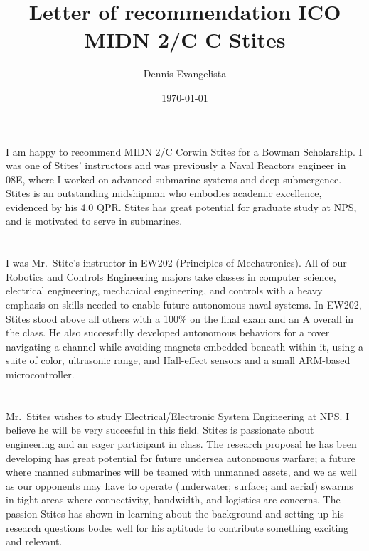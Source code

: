 \documentclass[10pt,courier]{navymemo}
\author{Dennis Evangelista}
\title{Letter of recommendation ICO MIDN 2/C C Stites}
\date{\today}
\begin{document}
\makedateblock{}

\MEMORANDUM{}

\begin{navyletterheader}
\navyskip{}%
\navysubjline{}%
\end{navyletterheader}


\section{} 
I am happy to recommend MIDN 2/C Corwin Stites for a Bowman Scholarship.  I was one of Stites' instructors and was previously a Naval Reactors engineer in 08E, where I worked on advanced submarine systems and deep submergence. Stites is an outstanding midshipman who embodies academic excellence, evidenced by his 4.0 QPR. Stites has great potential for graduate study at NPS, and is motivated to serve in submarines.  

\section{}
I was Mr.~Stite's instructor in EW202 (Principles of Mechatronics).  All of our Robotics and Controls Engineering majors take classes in computer science, electrical engineering, mechanical engineering, and controls with a heavy emphasis on skills needed to enable future autonomous naval systems. In EW202, Stites stood above all others with a 100\% on the final exam and an A overall in the class. He also successfully developed autonomous behaviors for a rover navigating a channel while avoiding magnets embedded beneath within it, using a suite of color, ultrasonic range, and Hall-effect sensors and a small ARM-based microcontroller. 

\section{}
Mr.~Stites wishes to study Electrical/Electronic System Engineering at NPS. I believe he will be very succesful in this field. Stites is passionate about engineering and an eager participant in class. The research proposal he has been developing has great potential for future undersea autonomous warfare; a future where manned submarines will be teamed with unmanned assets, and we as well as our opponents may have to operate (underwater; surface; and aerial) swarms in tight areas where connectivity, bandwidth, and logistics are concerns. The passion Stites has shown in learning about the background and setting up his research questions bodes well for his aptitude to contribute something exciting and relevant. 
\end{document}
